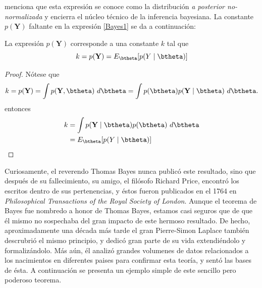  menciona que esta expresión se conoce como la distribución \emph{a posterior no-normalizada} y encierra el núcleo técnico de la inferencia bayesiana. La constante $p(\mathbf{Y})$ faltante en la expresión {\ref{Bayes1}} se da a continuación:

\begin{Res}\label{Res131}
La expresión $p(\mathbf{Y})$ corresponde a una constante $k$ tal que
\begin{equation*}
k=p(\mathbf{Y})=E_{\btheta}[p(Y \mid \btheta)]
\end{equation*}
\end{Res}

\begin{proof}
Nótese que
\begin{equation*}
k=p(\mathbf{Y})=\int p(\mathbf{Y},\btheta)\ d\btheta=\int p(\btheta)p(\mathbf{Y} \mid \btheta)\ d\btheta.
\end{equation*}
entonces
\begin{align*}
k&=\int p(\mathbf{Y} \mid \btheta)p(\btheta)\ d\btheta\\
&=E_{\btheta}[p(Y \mid \btheta)]
\end{align*}
\end{proof}

Curiosamente, el reverendo Thomas Bayes nunca publicó este resultado, sino que después de su fallecimiento, su amigo, el filósofo Richard Price, encontró los escritos dentro de sus pertenencias, y éstos fueron publicados en el 1764 en \emph{Philosophical Transactions of the Royal Society of London}. Aunque el teorema de Bayes fue nombredo a honor de Thomas Bayes, estamos casi seguros que de que él mismo no sospechaba del gran impacto de este hermoso resultado. De hecho, aproximadamente una década más tarde el gran Pierre-Simon Laplace también descrubrió el mismo principio, y dedicó gran parte de su vida extendiéndolo y formalizándolo. Más aún, él analizó grandes volumenes de datos relacionados a los nacimientos en diferentes paises para confirmar esta teoría, y sentó las bases de ésta. A continuación se presenta un ejemplo simple de este sencillo pero poderoso teorema.


